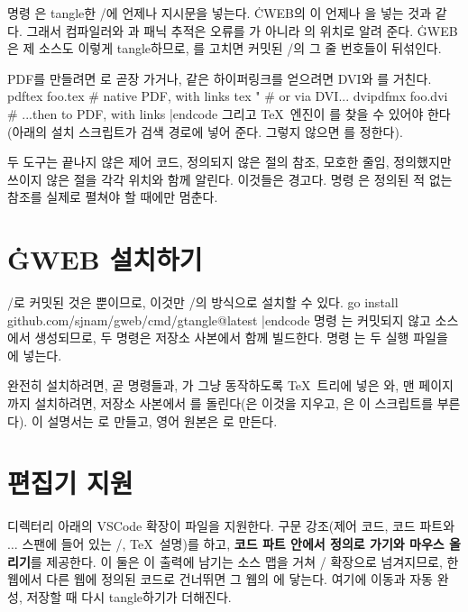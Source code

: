 명령 은 tangle한 \GO/에 언제나  지시문을 넣는다.
\.{CWEB}의 이 언제나 을 넣는 것과 같다. 그래서 컴파일러와
과 패닉 추적은 오류를 가 아니라 의 위치로 알려 준다.
\.{GWEB}은 제 소스도 이렇게 tangle하므로, 를 고치면 커밋된 \GO/의 그
줄 번호들이 뒤섞인다.

PDF를 만들려면 로 곧장 가거나, 같은 하이퍼링크를 얻으려면 DVI와
를 거친다.
\begincode
pdftex foo.tex                       # native PDF, with links
tex "\let\pdf+        # or via DVI...
dvipdfmx foo.dvi                     # ...then to PDF, with links
|endcode
그리고 \TeX\ 엔진이 를 찾을 수 있어야 한다(아래의 설치 스크립트가 검색
경로에 넣어 준다. 그렇지 않으면 를 정한다).

두 도구는 끝나지 않은 제어 코드, 정의되지 않은 절의 참조, 모호한 
줄임, 정의했지만 쓰이지 않은 절을 각각  위치와 함께 알린다.
이것들은 경고다. 명령 은 정의된 적 없는 참조를 실제로 펼쳐야 할
때에만 멈춘다.

\chapter{\.{GWEB} 설치하기}
\noindent \GO/로 커밋된 것은 뿐이므로, 이것만 \GO/의 방식으로 설치할
수 있다.
\begincode
go install github.com/sjnam/gweb/cmd/gtangle@latest
|endcode
명령 는 커밋되지 않고  소스에서 생성되므로, 두 명령은
저장소 사본에서 함께 빌드한다. 명령 는 두 실행 파일을
에 넣는다.

완전히 설치하려면, 곧 명령들과, 가 그냥 동작하도록 \TeX\
트리에 넣은 와, 맨 페이지까지 설치하려면, 저장소 사본에서
를 돌린다(은 이것을 지우고,
은 이 스크립트를 부른다). 이 설명서는 로
만들고, 영어 원본은 로 만든다.

\chapter{편집기 지원}
\noindent 디렉터리  아래의 VS\thinspace Code 확장이  파일을
지원한다. 구문 강조(제어 코드, 코드 파트와 \cw{|}$\ldots$\cw{|} 스팬에 들어 있는
\GO/, \TeX\ 설명)를 하고, {\bf 코드 파트 안에서 정의로 가기와 마우스 올리기}를
제공한다. 이 둘은 이 출력에 남기는  소스 맵을 거쳐
\GO/ 확장으로 넘겨지므로, 한 웹에서 다른 웹에 정의된 코드로 건너뛰면 그 웹의
에 닿는다. 여기에  이동과 자동 완성, 저장할 때 다시
tangle하기가 더해진다.

